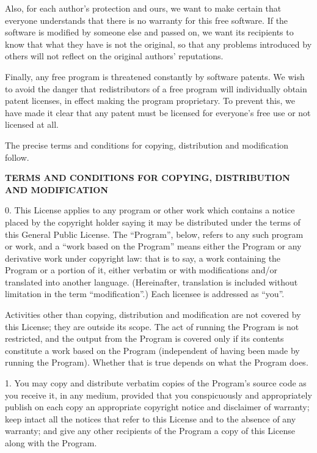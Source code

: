   Also, for each author's protection and ours, we want to make certain
that everyone understands that there is no warranty for this free
software.  If the software is modified by someone else and passed on, we
want its recipients to know that what they have is not the original, so
that any problems introduced by others will not reflect on the original
authors' reputations.

  Finally, any free program is threatened constantly by software
patents.  We wish to avoid the danger that redistributors of a free
program will individually obtain patent licenses, in effect making the
program proprietary.  To prevent this, we have made it clear that any
patent must be licensed for everyone's free use or not licensed at all.

  The precise terms and conditions for copying, distribution and
modification follow.

\vfill\eject
{}

\centerline{\bf TERMS AND CONDITIONS FOR COPYING, DISTRIBUTION AND
                MODIFICATION}

\item{0.} This License applies to any program or other work which
contains a notice placed by the copyright holder saying it may be
distributed under the terms of this General Public License.  The
``Program'', below, refers to any such program or work, and a ``work
based on the Program'' means either the Program or any derivative work
under copyright law: that is to say, a work containing the Program or a
portion of it, either verbatim or with modifications and/or translated
into another language.  (Hereinafter, translation is included without
limitation in the term ``modification''.)  Each licensee is addressed as
``you''.

\item{} Activities other than copying, distribution and modification are
not covered by this License; they are outside its scope.  The act of
running the Program is not restricted, and the output from the Program
is covered only if its contents constitute a work based on the Program
(independent of having been made by running the Program).  Whether that
is true depends on what the Program does.

\item{1.} You may copy and distribute verbatim copies of the Program's
source code as you receive it, in any medium, provided that you
conspicuously and appropriately publish on each copy an appropriate
copyright notice and disclaimer of warranty; keep intact all the
notices that refer to this License and to the absence of any warranty;
and give any other recipients of the Program a copy of this License
along with the Program.

